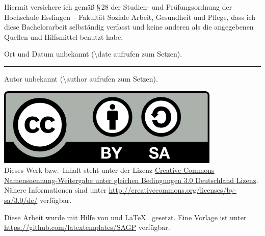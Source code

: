 \documentclass[a4paper,oneside,fontsize=11pt,headsepline,parskip=off,open=any,headings=small,listof=totoc,bibliography=totoc]{scrbook}
\newcommand{\OrtDatumWieImTitel}{Ort und Datum unbekannt (\textbackslash date aufrufen zum Setzen).}
\newcommand{\AutorWieImTitel}{Autor unbekannt (\textbackslash author aufrufen zum Setzen).}
\begin{document}
\begin{center}
  \begin{minipage}{\textwidth}
%   
    Hiermit versichere ich gemäß §\,28 der Studien- und
    Prüfungsordnung der Hochschule Esslingen -- Fakultät Soziale
    Arbeit, Gesundheit und Pflege, dass ich diese Bachelorarbeit
    selbständig verfasst und keine anderen als die angegebenen Quellen
    und Hilfsmittel benutzt habe.

      \vspace{3ex}%
    \OrtDatumWieImTitel %
  
  
    \vspace{2cm}\hrule\vspace{.2cm}%
    \AutorWieImTitel %
  \end{minipage}
\end{center}

\null\vfill%
\noindent%
\href{http://creativecommons.org/licenses/by-sa/3.0/de/}{\includegraphics[scale=.5]{by-sa}}\\
Dieses Werk bzw.\ Inhalt steht unter der Lizenz
\href{http://creativecommons.org/licenses/by-sa/3.0/de/}{Creative
  Commons Namensnennung-Weitergabe unter gleichen Bedingungen 3.0
  Deutschland Lizenz}.  Nähere Informationen sind unter
\url{http://creativecommons.org/licenses/by-sa/3.0/de/} verfügbar.

\medskip\noindent%
Diese Arbeit wurde mit Hilfe von
\href{http://www.komascript.de/}{\KOMAScript}
und %
\LaTeX\ %
gesetzt.
%
Eine Vorlage ist unter
\href{https://github.com/latextemplates/SAGP}{{https://github.com/latextemplates/SAGP}}
verfügbar.
\end{document}

